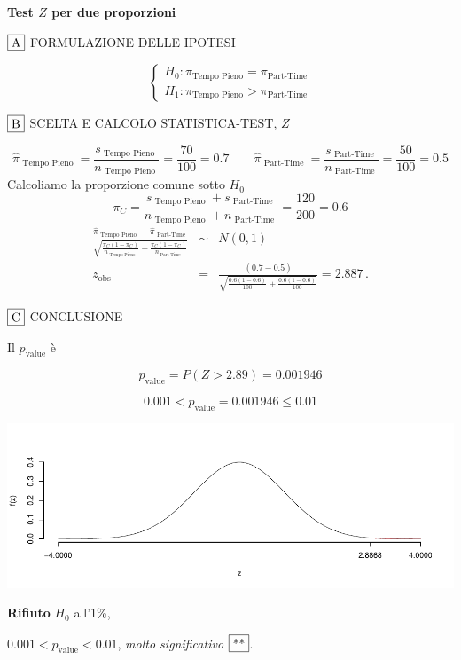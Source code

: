 \documentclass[
  11pt,
]{book}
\theoremstyle{mytheoremstyle}
\theoremstyle{mydefstyle}
\newenvironment{sol}
  {
  \begin{tcolorbox}[enhanced,breakable,arc=0.1mm,boxrule=1pt,colback=white,colframe=iblue,
  title=\bf \fontfamily{lmss}\selectfont \hspace{.5 cm} Soluzione,drop fuzzy shadow]

}{
\end{tcolorbox}
  }
\begin{document}
\begin{sol}
\textbf{Test \(Z\) per due proporzioni}

\(\fbox{A}\) FORMULAZIONE DELLE IPOTESI

\[\begin{cases}
   H_0: \pi_\text{Tempo Pieno} = \pi_\text{Part-Time} \\
   H_1: \pi_\text{Tempo Pieno} > \pi_\text{Part-Time} 
   \end{cases}\]

\(\fbox{B}\) SCELTA E CALCOLO STATISTICA-TEST, \(Z\)

\[\hat\pi_\text{ Tempo Pieno }=\frac{s_\text{ Tempo Pieno }}{n_\text{ Tempo Pieno }}=\frac{ 70 }{ 100 }= 0.7 \qquad
   \hat\pi_\text{ Part-Time }=\frac{s_\text{ Part-Time }}{n_\text{ Part-Time }}=\frac{ 50 }{ 100 }= 0.5 \]Calcoliamo la proporzione comune sotto \(H_0\)
\[
     \pi_C=\frac{s_\text{ Tempo Pieno }+s_\text{ Part-Time }}{n_\text{ Tempo Pieno }+n_\text{ Part-Time }}=
     \frac{ 120 }{ 200 }= 0.6 
   \]\begin{eqnarray*}
   \frac{\hat\pi_\text{ Tempo Pieno } - \hat\pi_\text{ Part-Time }}
   {\sqrt{\frac {\pi_C(1-\pi_C)}{n_\text{ Tempo Pieno }}+\frac {\pi_C(1-\pi_C)}{n_\text{ Part-Time }}}}&\sim&N(0,1)\\
   z_{\text{obs}}
   &=& \frac{ ( 0.7 -  0.5 )} {\sqrt{\frac{ 0.6 (1- 0.6 )}{ 100 }+\frac{ 0.6 (1- 0.6 )}{ 100 }}}
   =   2.887 \, .
   \end{eqnarray*}

\(\fbox{C}\) CONCLUSIONE

Il \(p_{\text{value}}\) è

\[ p_{\text{value}} = P(Z>2.89)=0.001946 \]

\[
 0.001 < p_\text{value}= 0.001946 \leq 0.01 
\]

\begin{center}\includegraphics{Esami_passati_con_soluzioni_files/figure-latex/05-test-17,-1} \end{center}

\textbf{Rifiuto} \(H_0\) all'1\%,

\(0.001<p_\text{value}<0.01\), \emph{molto significativo} \(\fbox{**}\).

\end{sol}
\end{document}
